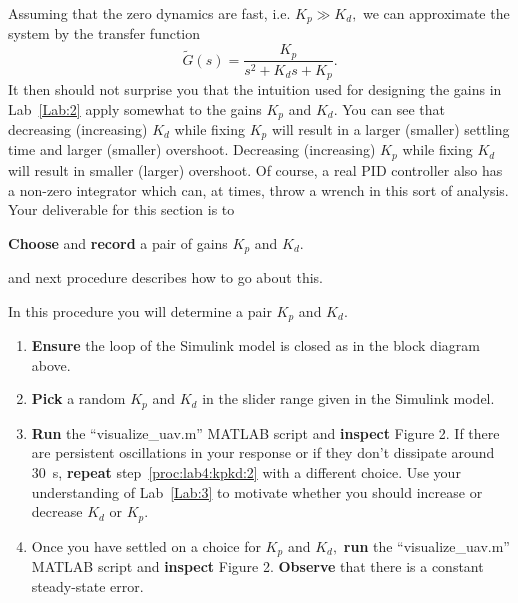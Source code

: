 Assuming that the zero dynamics are fast, i.e. \(K_p \gg K_d,\) we can approximate the system by the transfer function
\[
  \tilde{G}(s) = \frac{K_p}{s^2 + K_d s + K_p}.
\]
It then should not surprise you that the intuition used for designing the gains in Lab~\ref{Lab:2} apply somewhat to the gains \(K_p\) and \(K_d.\)
You can see that decreasing (increasing) \(K_d\) while fixing \(K_p\) will result in a larger (smaller) settling time and larger (smaller) overshoot.
Decreasing (increasing) \(K_p\) while fixing \(K_d\) will result in smaller (larger) overshoot.
Of course, a real PID controller also has a non-zero integrator which can, at times, throw a wrench in this sort of analysis.
Your deliverable for this section is to
%
\begin{deliverable}[label={del:lab4:p1:1}]
  \textbf{Choose} and \textbf{record} a pair of gains \(K_p\) and \(K_d.\)
\end{deliverable}
%
and next procedure describes how to go about this.
%
\begin{procedure}[label={proc:lab4:kpkd}]
  In this procedure you will determine a pair \(K_p\) and \(K_d.\)
  \begin{enumerate}[label={(\arabic*)}]
    \item{%
      \textbf{Ensure} the loop of the Simulink model is closed as in the block diagram above.
    }
    \item{%
      \textbf{Pick} a random \(K_p\) and \(K_d\) in the slider range given in the Simulink model.
      \label{proc:lab4:kpkd:2}
    }
    \item{%
      \textbf{Run} the ``visualize\_uav.m'' MATLAB script and \textbf{inspect} Figure 2.
      If there are persistent oscillations in your response or if they don't dissipate around \SI{30}{s}, \textbf{repeat} step~\ref{proc:lab4:kpkd:2} with a different choice.
      Use your understanding of Lab~\ref{Lab:3} to motivate whether you should increase or decrease \(K_d\) or \(K_p.\)
    }
    \item{%
      Once you have settled on a choice for \(K_p\) and \(K_d,\)
      \textbf{run} the ``visualize\_uav.m'' MATLAB script and \textbf{inspect} Figure 2.
      \textbf{Observe} that there is a constant steady-state error.
    }
  \end{enumerate}
\end{procedure}


